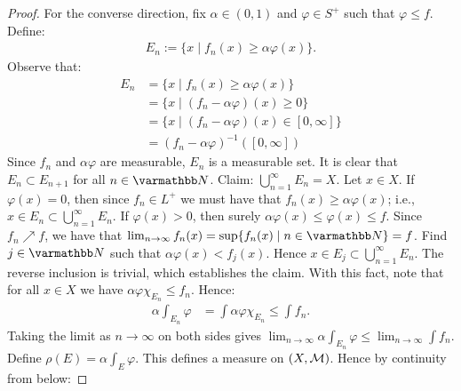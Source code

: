 \begin{proof}
        For the converse direction, fix $\alpha \in (0,1)$ and $\varphi \in S^+$ such that $\varphi \leq f$. Define:
            \begin{equation*}
            \begin{split}
                E_n := \{x \mid f_n(x) \geq \alpha \varphi(x)\}.
            \end{split}
            \end{equation*}
        Observe that:
            \begin{equation*}
            \begin{split}
                E_n 
                & = \{x \mid f_n(x) \geq \alpha \varphi(x)\} \\
                & = \{x \mid (f_n - \alpha \varphi)(x) \geq 0 \} \\
                & = \{x \mid (f_n - \alpha \varphi)(x) \in [0,\infty]\} \\
                & = (f_n-\alpha \varphi)^{-1} \left( [0,\infty] \right)
            \end{split}
            \end{equation*}
        Since $f_n$ and $\alpha \varphi$ are measurable, $E_n$ is a measurable set. It is clear that $E_n \subset E_{n+1}$ for all $n \in \bfN$. Claim: $\bigcup_{n = 1}^\infty E_n = X$. Let $x \in X$. If $\varphi(x) = 0$, then since $f_n \in L^+$ we must have that $f_n(x) \geq \alpha \varphi(x)$; i.e., $x \in E_n \subset \bigcup_{n =1 }^\infty E_n$. If $\varphi(x) > 0$, then surely $\alpha \varphi(x) \leq \varphi(x) \leq f$. Since $f_n \nearrow f$, we have that $\lim_{n \rightarrow \infty}f_n(x) = \sup\{f_n(x) \mid n \in \bfN\} = f$. Find $j \in \bfN$ such that $\alpha \varphi(x) < f_j(x)$. Hence $x \in E_j \subset \bigcup_{n = 1}^\infty E_n$. The reverse inclusion is trivial, which establishes the claim. With this fact, note that for all $x \in X$ we have $\alpha\varphi\chi_{E_n} \leq f_n$. Hence:
            \begin{equation*}
            \begin{split}
                \alpha \int_{E_n} \varphi & = \int \alpha \varphi \chi_{E_n} \leq \int f_n.
            \end{split}
            \end{equation*}
        Taking the limit as $n \rightarrow \infty$ on both sides gives $\lim_{n \rightarrow \infty} \alpha \int_{E_n}\varphi \leq \lim_{n \rightarrow \infty}\int f_n$. Define $\rho(E) = \alpha \int_E \varphi$. This defines a measure on $(X,\mathcal{M})$. Hence by continuity from below:

\end{proof}
